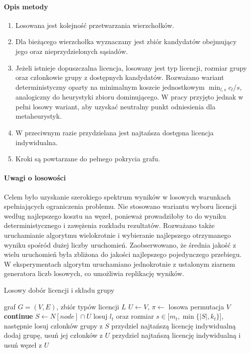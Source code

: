 \paragraph{Opis metody}
\begin{enumerate}
  \item Losowana jest kolejność przetwarzania wierzchołków.
  \item Dla bieżącego wierzchołka wyznaczany jest zbiór kandydatów obejmujący jego oraz nieprzydzielonych sąsiadów.
  \item Jeżeli istnieje dopuszczalna licencja, losowany jest typ licencji, rozmiar grupy oraz członkowie grupy z dostępnych kandydatów.
        Rozważano wariant deterministyczny oparty na minimalnym koszcie jednostkowym \(\min_{l,s} c_l/s\), analogiczny do heurystyki zbioru dominującego. W pracy przyjęto jednak w pełni losowy wariant, aby uzyskać neutralny punkt odniesienia dla metaheurystyk.
  \item W przeciwnym razie przydzielana jest najtańsza dostępna licencja indywidualna.
  \item Kroki są powtarzane do pełnego pokrycia grafu.
\end{enumerate}

\paragraph{Uwagi o losowości}
Celem było uzyskanie szerokiego spektrum wyników w losowych warunkach spełniających ograniczenia problemu.
Nie stosowano wariantu wyboru licencji według najlepszego kosztu na węzeł, ponieważ prowadziłoby to do wyniku deterministycznego i zawężenia rozkładu rezultatów.
Rozważano także uruchamianie algorytmu wielokrotnie i wybieranie najlepszego otrzymanego wyniku spośród dużej liczby uruchomień.
Zaobserwowano, że średnia jakość z wielu uruchomień była zbliżona do jakości najlepszego pojedynczego przebiegu.
W eksperymentach algorytm uruchamiano jednokrotnie z ustalonym ziarnem generatora liczb losowych, co umożliwia replikację wyników.

\begin{algorithm}[H]
  \caption{Losowy dobór licencji i składu grupy}\label{alg:randomized}
  \begin{algorithmic}[1]
    \Require graf $G=(V,E)$, zbiór typów licencji $L$
    \State $U\gets V$, $\pi\gets$ losowa permutacja $V$
     \textbf{continue} \EndIf
    \State $S\gets N[node]\cap U$
    \State losuj $l_t$ oraz rozmiar $s\in\bigl[m_t,\min\{|S|,k_t\}\bigr]$, następnie losuj członków grupy z $S$
    \Else
    \State przydziel najtańszą licencję indywidualną
    \EndIf
    \State dodaj grupę, usuń jej członków z $U$
    \EndFor
     przydziel najtańszą licencję indywidualną i usuń węzeł z $U$ \EndWhile
  \end{algorithmic}
\end{algorithm}

